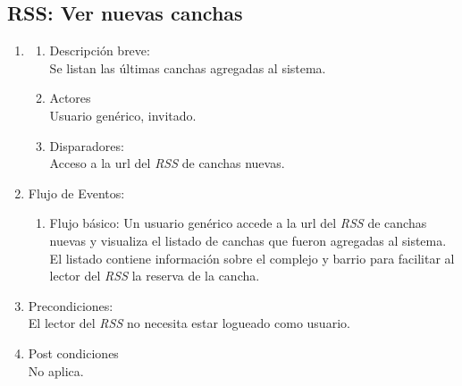 \documentclass[a4paper,11pt]{article}
\begin{document}
\subsection{RSS: Ver nuevas canchas}
\begin{enumerate}

    \item
    \begin{enumerate}
        \item Descripción breve: \\
            Se listan las últimas canchas agregadas al sistema.
        \item Actores \\
            Usuario genérico, invitado.
        \item Disparadores: \\
            Acceso a la url del \emph{RSS} de canchas nuevas.

    \end{enumerate}

    \item Flujo de Eventos: 

        \begin{enumerate}
            \item Flujo básico:
                Un usuario genérico accede a la url del \emph{RSS}  de canchas nuevas
                y visualiza el listado de canchas que fueron agregadas al sistema. El
                listado contiene información sobre el complejo y barrio para facilitar
                al lector del \emph{RSS} la reserva de la cancha.
        \end{enumerate}

    \item Precondiciones: \\
        El lector del \emph{RSS} no necesita estar logueado como usuario.

    \item Post condiciones \\
        No aplica.

\end{enumerate}

\end{document}
